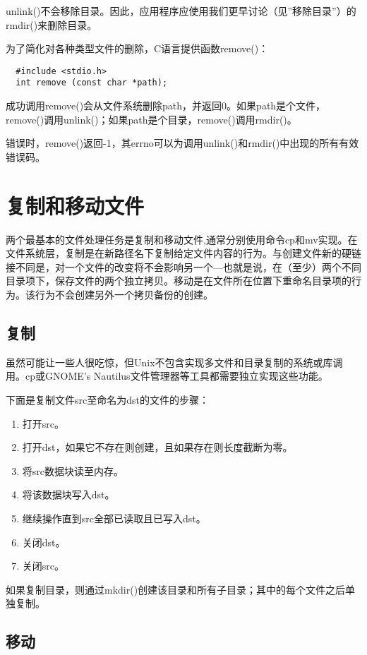 unlink()不会移除目录。因此，应用程序应使用我们更早讨论（见''移除目录''）的rmdir()来删除目录。

为了简化对各种类型文件的删除，C语言提供函数remove()：

\begin{lstlisting}
  #include <stdio.h>
  int remove (const char *path);
\end{lstlisting}

成功调用remove()会从文件系统删除path，并返回0。如果path是个文件，remove()调用unlink()；如果path是个目录，remove()调用rmdir()。

错误时，remove()返回-1，其errno可以为调用unlink()和rmdir()中出现的所有有效错误码。

\section{复制和移动文件}

两个最基本的文件处理任务是复制和移动文件,通常分别使用命令cp和mv实现。在文件系统层，复制是在新路径名下复制给定文件内容的行为。与创建文件新的硬链接不同是，对一个文件的改变将不会影响另一个—也就是说，在（至少）两个不同目录项下，保存文件的两个独立拷贝。移动是在文件所在位置下重命名目录项的行为。该行为不会创建另外一个拷贝备份的创建。

\subsection{复制}

虽然可能让一些人很吃惊，但Unix不包含实现多文件和目录复制的系统或库调用。cp或GNOME’s Nautilus文件管理器等工具都需要独立实现这些功能。

下面是复制文件src至命名为dst的文件的步骤：

\begin{enumerate}
\item 打开src。
\item 打开dst，如果它不存在则创建，且如果存在则长度截断为零。
\item 将src数据块读至内存。
\item 将该数据块写入dst。
\item 继续操作直到src全部已读取且已写入dst。
\item 关闭dst。
\item 关闭src。
\end{enumerate}

如果复制目录，则通过mkdir()创建该目录和所有子目录；其中的每个文件之后单独复制。

\subsection{移动}

